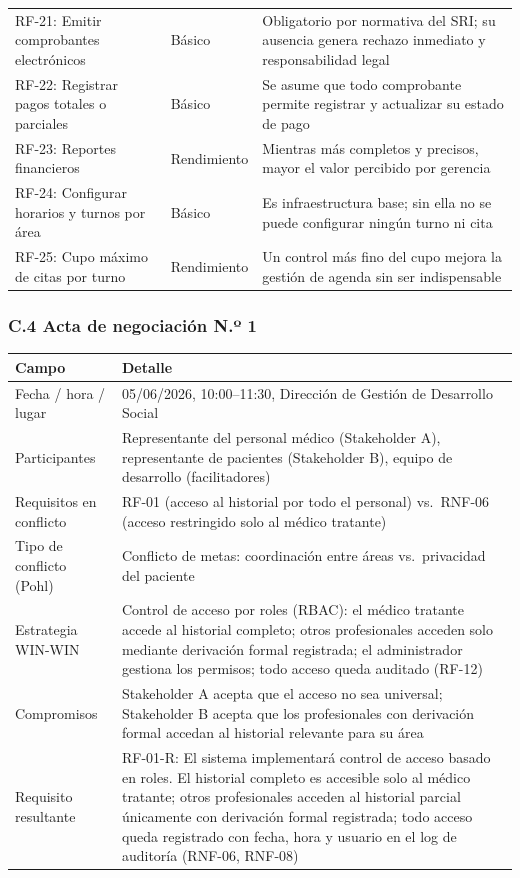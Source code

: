 \documentclass[11pt,a4paper]{article}
\begin{document}
\begin{longtable}{p{} p{} p{}}
		RF-21: Emitir comprobantes electrónicos & Básico & Obligatorio por normativa del SRI; su ausencia genera rechazo inmediato y responsabilidad legal \\
		RF-22: Registrar pagos totales o parciales & Básico & Se asume que todo comprobante permite registrar y actualizar su estado de pago \\
		RF-23: Reportes financieros & Rendimiento & Mientras más completos y precisos, mayor el valor percibido por gerencia \\
		RF-24: Configurar horarios y turnos por área & Básico & Es infraestructura base; sin ella no se puede configurar ningún turno ni cita \\
		RF-25: Cupo máximo de citas por turno & Rendimiento & Un control más fino del cupo mejora la gestión de agenda sin ser indispensable \\
	\end{longtable}
	
	\subsubsection{C.4 Acta de negociación N.º 1}
	
	\begin{longtable}{p{} p{} }
		
		
		\toprule
		\textbf{Campo} &
		\textbf{Detalle}  \\
		\midrule
		\endhead
		
		Fecha / hora / lugar & 05/06/2026, 10:00--11:30, Dirección de Gestión de Desarrollo Social \\
		Participantes & Representante del personal médico (Stakeholder A), representante de pacientes (Stakeholder B), equipo de desarrollo (facilitadores) \\
		Requisitos en conflicto & RF-01 (acceso al historial por todo el personal) vs.~RNF-06 (acceso restringido solo al médico tratante) \\
		Tipo de conflicto (Pohl) & Conflicto de metas: coordinación entre áreas vs.~privacidad del paciente \\
		Estrategia WIN-WIN & Control de acceso por roles (RBAC): el médico tratante accede al historial completo; otros profesionales acceden solo mediante derivación formal registrada; el administrador gestiona los permisos; todo acceso queda auditado (RF-12) \\
		Compromisos & Stakeholder A acepta que el acceso no sea universal; Stakeholder B acepta que los profesionales con derivación formal accedan al historial relevante para su área \\
		Requisito resultante & RF-01-R: El sistema implementará control de acceso basado en roles. El historial completo es accesible solo al médico tratante; otros profesionales acceden al historial parcial únicamente con derivación formal registrada; todo acceso queda registrado con fecha, hora y usuario en el log de auditoría (RNF-06, RNF-08) \\
		\bottomrule
	\end{longtable}
	
\end{document}
